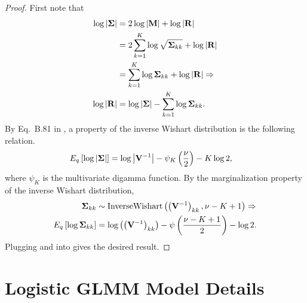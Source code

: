 \documentclass{article}\usepackage[]{graphicx}\usepackage[]{color}
\theoremstyle{definition}
\theoremstyle{plain}
\theoremstyle{plain}
\theoremstyle{plain}
\theoremstyle{definition}
\theoremstyle{plain}
\theoremstyle{plain}
\begin{document}
\begin{proof}
    First note that
\begin{align}
\nonumber
\log\left|\boldsymbol{\Sigma}\right| & =
    2\log\left|\mathbf{M}\right|+\log\left|\mathbf{R}\right|\\
\nonumber
 & =2\sum_{k=1}^{K}\log\sqrt{\boldsymbol{\Sigma}_{kk}}+
    \log\left|\mathbf{R}\right|\\
\nonumber
 & =\sum_{k=1}^{K}\log\boldsymbol{\Sigma}_{kk}+
    \log\left|\mathbf{R}\right|\Rightarrow\\
\label{eq:logdet_corr}
\log\left|\mathbf{R}\right| & =\log\left|\boldsymbol{\Sigma}\right|-
    \sum_{k=1}^{K}\log\boldsymbol{\Sigma}_{kk}.
\end{align}
By Eq.\ B.81 in \citep{bishop:2006:pattern}, a property of the inverse Wishart distribution is the following relation.
\begin{align}
\label{eq:inv_wish_logdet}
E_{q}\left[\log\left|\boldsymbol{\Sigma}\right|\right] &
    =\log\left|\mathbf{V}^{-1}\right|-\psi_{K}\left(\frac{\nu}{2}\right)-K\log2,
\end{align}
where $\psi_{K}$ is the multivariate digamma function. By the marginalization
property of the inverse Wishart distribution,
\begin{align}
\nonumber
\boldsymbol{\Sigma}_{kk} & \sim\textrm{InverseWishart}\left(
    \left(\mathbf{V}^{-1}\right)_{kk},\nu-K+1\right)\Rightarrow\\
\label{eq:inv_wish_logdet_comps}
E_{q}\left[\log\boldsymbol{\Sigma}_{kk}\right] & =
    \log\left(\left(\mathbf{V}^{-1}\right)_{kk}\right)-
    \psi\left(\frac{\nu-K+1}{2}\right)-\log2.
\end{align}
Plugging  and  into  gives the desired result.
\end{proof}

\section{Logistic GLMM Model Details\label{app:glmm_details}}
\end{document}
